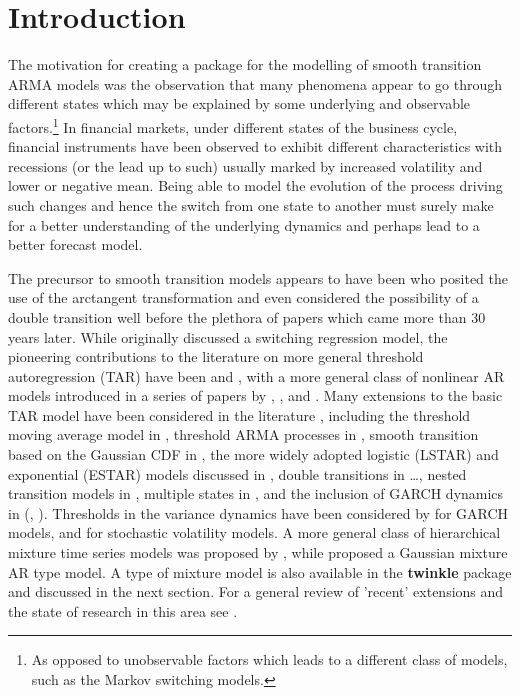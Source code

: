 \section{Introduction}
The motivation for creating a package for the modelling of smooth transition
ARMA models was the observation that many phenomena appear to go
through different states which may be explained by some underlying and
observable factors.\footnote{As opposed to unobservable factors which leads to
a different class of models, such as the Markov switching models.}
In financial markets, under different states of the business cycle, financial
instruments have been observed to exhibit different characteristics with
recessions (or the lead up to such) usually marked by increased volatility and lower 
or negative mean. Being able to model the evolution of the process driving such 
changes and hence the switch from one state to another must surely make for a 
better understanding of the underlying dynamics and perhaps lead to a better
forecast model.

The precursor to smooth transition models appears to have been
\cite{Carmichael1928} who posited the use of the arctangent transformation
and even considered the possibility of a double transition well before the
plethora of papers which came more than 30 years later. While \cite{Quandt1958}
originally discussed a switching regression model, the pioneering contributions
to the literature on more general threshold autoregression (TAR) have
been \cite{Tong1980} and \cite{Tong1981}, with a more general class of nonlinear
AR models introduced in a series of papers by \cite{Billings1983}, \cite{Billings1986},
and \cite{Zhu1993}. Many extensions to the basic TAR model have been considered
in the literature , including the threshold moving average model in
\cite{Gooijer1998}, threshold ARMA processes in \cite{Brockwell1992}, smooth
transition based on the Gaussian CDF in \cite{ChanTong1986}, the more widely
adopted logistic (LSTAR) and exponential (ESTAR) models discussed in
\cite{Terasvirta1994}, double transitions in \ldots , nested transition
models in \cite{Astatkie1997}, multiple states in \cite{Dijk1999}, and the
inclusion of GARCH dynamics in \citeauthor{Chan2002}(\citeyear{Chan2002}, 
\citeyear{Chan2003}). Thresholds in the variance dynamics have been considered
by \cite{Zakoian1994} for GARCH models, and \cite{So2002} for stochastic
volatility models. A more general class of hierarchical mixture time series models 
was proposed by \cite{Huerta2003}, while \cite{Kalliovirta2012} proposed a 
Gaussian mixture AR type model. A type of mixture model is also available in
the \textbf{twinkle} package and discussed in the next section. For a general 
review of 'recent' extensions and the state of research in this area
see \cite{Dijk2002}.

